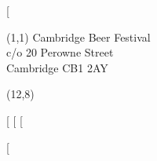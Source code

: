 \documentclass[english,a4paper]{article}
\begin{document}
[%

\begin{textblock}{7}(1,1)
\small{Cambridge Beer Festival}\\
\small{c/o 20 Perowne Street}\\
\small{Cambridge CB1 2AY}\\
\end{textblock}

\begin{textblock}{30}(12,8)
\large

[%
[%
[%

\end{textblock}
\null\newpage

[%
\end{document}
